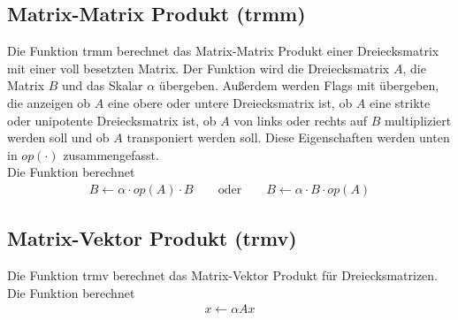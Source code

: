 \subsection{Matrix-Matrix Produkt (trmm)}
Die Funktion \glqq trmm\grqq{} berechnet das Matrix-Matrix Produkt einer Dreiecksmatrix mit einer voll besetzten Matrix.
Der Funktion wird die Dreiecksmatrix $A$, die Matrix $B$ und das Skalar $\alpha$ übergeben. Außerdem werden Flags mit übergeben, die anzeigen ob $A$ eine obere oder untere Dreiecksmatrix ist, ob $A$ eine strikte oder unipotente Dreiecksmatrix ist, ob $A$ von links oder rechts auf $B$ multipliziert werden soll und ob $A$ transponiert werden soll. Diese Eigenschaften werden unten in $op(\cdot)$ zusammengefasst. \\
Die Funktion berechnet
\begin{align}
B \leftarrow  \alpha \cdot op(A) \cdot B \qquad \text{oder} \qquad B \leftarrow  \alpha \cdot B \cdot op(A)
\end{align}
\subsection{Matrix-Vektor Produkt (trmv)}
Die Funktion \glqq trmv\grqq{} berechnet das Matrix-Vektor Produkt für Dreiecksmatrizen.
Die Funktion berechnet
\begin{align}
x \leftarrow \alpha  Ax %
\end{align}


